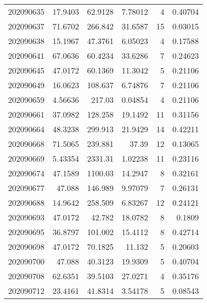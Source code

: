\begin{tabular}{rrrrrr}
 202090635 &         17.9403  &       62.9128 &            7.78012 &           4 & 0.40704 \\
 202090637 &         71.6702  &      266.842  &           31.6587  &          15 & 0.03015 \\
 202090638 &         15.1967  &       47.3761 &            6.05023 &           4 & 0.17588 \\
 202090641 &         67.0636  &       60.4234 &           33.6286  &           7 & 0.24623 \\
 202090645 &         47.0172  &       60.1369 &           11.3042  &           5 & 0.21106 \\
 202090649 &         16.0623  &      108.637  &            6.74876 &           7 & 0.21106 \\
 202090659 &          4.56636 &      217.03   &            0.04854 &           4 & 0.21106 \\
 202090661 &         37.0982  &      128.258  &           19.1492  &          11 & 0.31156 \\
 202090664 &         48.3238  &      299.913  &           21.9429  &          14 & 0.42211 \\
 202090668 &         71.5065  &      239.881  &           37.39    &          12 & 0.13065 \\
 202090669 &          5.43354 &     2331.31   &            1.02238 &          11 & 0.23116 \\
 202090674 &         47.1589  &     1100.03   &           14.2947  &           8 & 0.32161 \\
 202090677 &         47.088   &      146.989  &            9.97079 &           7 & 0.26131 \\
 202090688 &         14.9642  &      258.509  &            6.83267 &          12 & 0.24121 \\
 202090693 &         47.0172  &       42.782  &           18.0782  &           8 & 0.1809  \\
 202090695 &         36.8797  &      101.002  &           15.4112  &           8 & 0.42714 \\
 202090698 &         47.0172  &       70.1825 &           11.132   &           5 & 0.20603 \\
 202090700 &         47.088   &       40.3123 &           19.9309  &           5 & 0.40704 \\
 202090708 &         62.6351  &       39.5103 &           27.0271  &           4 & 0.35176 \\
 202090712 &         23.4161  &       41.8314 &            3.54178 &           5 & 0.08543 \\

\end{tabular}
